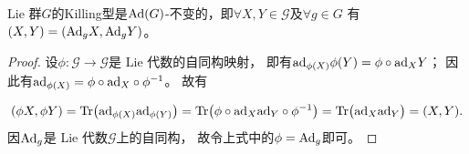 \begin{proposition}
     Lie 群$G$的Killing型是${\rm Ad}(G)$-不变的，即$\forall X,Y \in \mathscr{G}$及$\forall g\in G$
    有$(X,Y)=({\rm Ad}_g X, {\rm Ad}_g Y )$。
\end{proposition}
\begin{proof}
    设$\phi:\mathscr{G}\to \mathscr{G}$是 Lie 代数的自同构映射，
    即有${\rm ad}_{\phi(X)} \phi(Y)= \phi\circ {\rm ad}_X Y$；
    因此有${\rm ad}_{\phi(X)} = \phi\circ {\rm ad}_X \circ \phi^{-1}$。    故有
    
    \begin{align*}
        (\phi X, \phi Y )= {\rm Tr}\bigl( {\rm ad}_{\phi(X)} {\rm ad}_{\phi(Y)}\bigr)
        ={\rm Tr}\bigl( \phi\circ {\rm ad}_X {\rm ad}_Y \circ \phi^{-1}\bigr)
        ={\rm Tr}\bigl( {\rm ad}_X {\rm ad}_Y \bigr) = (X,Y).
    \end{align*}
    因${\rm Ad}_g$是 Lie 代数$\mathscr{G}$上的自同构，
    故令上式中的$\phi={\rm Ad}_g$即可。
\end{proof}


